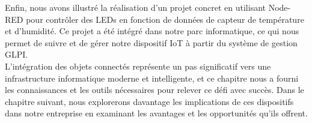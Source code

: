 Enfin, nous avons illustré la réalisation d'un projet concret en utilisant Node-RED pour contrôler des LEDs en fonction de données de capteur de température et d'humidité. Ce projet a été intégré dans notre parc informatique, ce qui nous permet de suivre et de gérer notre dispositif IoT à partir du système de gestion GLPI. \\

L'intégration des objets connectés représente un pas significatif vers une infrastructure informatique moderne et intelligente, et ce chapitre nous a fourni les connaissances et les outils nécessaires pour relever ce défi avec succès. Dans le chapitre suivant, nous explorerons davantage les implications de ces dispositifs dans notre entreprise en examinant les avantages et les opportunités qu'ils offrent. \\